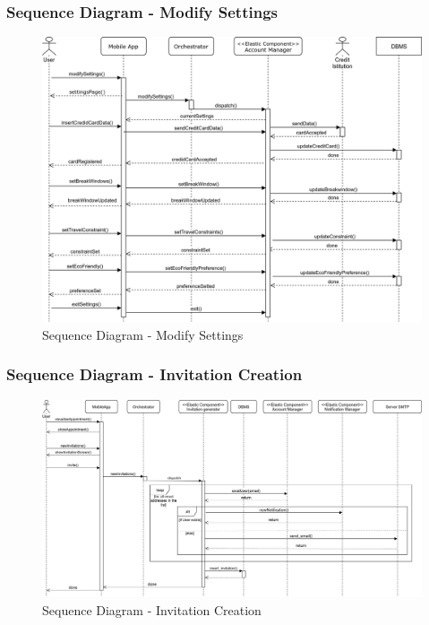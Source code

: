 	\subsubsection{Sequence Diagram - Modify Settings}
	\begin{figure}[H]
		\centerline{\includegraphics[width=0.9\paperwidth]{Images/ModifySettings}}
		\caption{Sequence Diagram - Modify Settings}
	\end{figure}

	\subsubsection{Sequence Diagram - Invitation Creation}
		\begin{figure}[H]
			\centerline{\includegraphics[width=0.9\paperwidth]{Images/SD_InvitationCreation}}
			\caption{Sequence Diagram - Invitation Creation}
		\end{figure}
		
